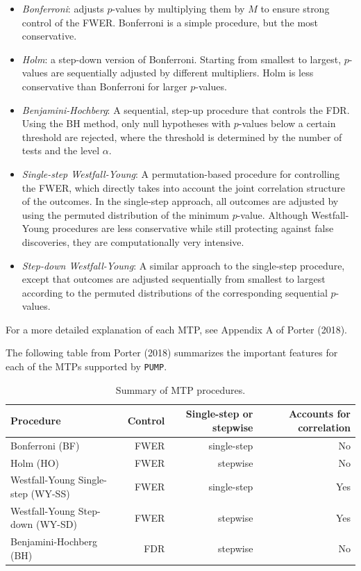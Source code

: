 \documentclass{article}
\providecommand{\tightlist}{%
  \setlength{\itemsep}{0pt}\setlength{\parskip}{0pt}}
\begin{document}
\begin{itemize}
\tightlist
\item
  \emph{Bonferroni}: adjusts \(p\)-values by multiplying them by \(M\)
  to ensure strong control of the FWER. Bonferroni is a simple
  procedure, but the most conservative.
\item
  \emph{Holm}: a step-down version of Bonferroni. Starting from smallest
  to largest, \(p\)-values are sequentially adjusted by different
  multipliers. Holm is less conservative than Bonferroni for larger
  \(p\)-values.
\item
  \emph{Benjamini-Hochberg}: A sequential, step-up procedure that
  controls the FDR. Using the BH method, only null hypotheses with
  \(p\)-values below a certain threshold are rejected, where the
  threshold is determined by the number of tests and the level
  \(\alpha\).
\item
  \emph{Single-step Westfall-Young}: A permutation-based procedure for
  controlling the FWER, which directly takes into account the joint
  correlation structure of the outcomes. In the single-step approach,
  all outcomes are adjusted by using the permuted distribution of the
  minimum \(p\)-value. Although Westfall-Young procedures are less
  conservative while still protecting against false discoveries, they
  are computationally very intensive.
\item
  \emph{Step-down Westfall-Young}: A similar approach to the single-step
  procedure, except that outcomes are adjusted sequentially from
  smallest to largest according to the permuted distributions of the
  corresponding sequential \(p\)-values.
\end{itemize}

For a more detailed explanation of each MTP, see Appendix A of Porter
(2018).

The following table from Porter (2018) summarizes the important features
for each of the MTPs supported by \texttt{PUMP}.

\begin{table}[h!]
\centering
\begin{tabular}{l r r r}
\toprule
Procedure                             & Control & Single-step or stepwise & Accounts for correlation \\ \midrule
Bonferroni (BF)                       & FWER    & single-step             & No                       \\
Holm (HO)                             & FWER    & stepwise                & No\\
Westfall-Young Single-step (WY-SS)    & FWER    & single-step             & Yes\\
Westfall-Young Step-down (WY-SD)      & FWER    & stepwise                & Yes\\
Benjamini-Hochberg (BH)               & FDR     & stepwise                & No \\
\bottomrule
\end{tabular}
\caption{Summary of MTP procedures.}
  \label{tab:mtp}
\end{table}
\end{document}
